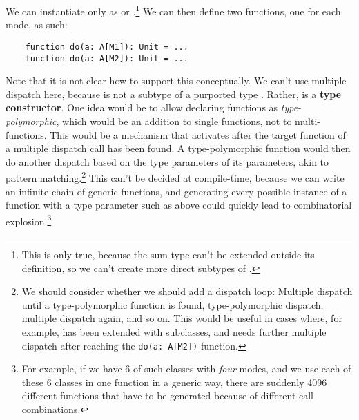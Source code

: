 We can instantiate  only as  or .\footnote{This is only true, because the sum type can't be extended outside its definition, so we can't create more direct subtypes of .} We can then define two functions, one for each mode, as such:

\begin{lstlisting}
    function do(a: A[M1]): Unit = ...
    function do(a: A[M2]): Unit = ...
\end{lstlisting}

Note that it is not clear how to support this conceptually. We can't use multiple dispatch here, because  is not a subtype of a purported type . Rather,  is a \textbf{type constructor}. One idea would be to allow declaring functions as \textit{type-polymorphic}, which would be an addition to single functions, not to multi-functions. This would be a mechanism that activates after the target function of a multiple dispatch call has been found. A type-polymorphic function would then do another dispatch based on the type parameters of its parameters, akin to pattern matching.\footnote{We should consider whether we should add a dispatch loop: Multiple dispatch until a type-polymorphic function is found, type-polymorphic dispatch, multiple dispatch again, and so on. This would be useful in cases where, for example,  has been extended with subclasses, and needs further multiple dispatch after reaching the \texttt{do(a: A[M2])} function.} This can't be decided at compile-time, because we can write an infinite chain of generic functions, and generating every possible instance of a function with a type parameter such as above could quickly lead to combinatorial explosion.\footnote{For example, if we have 6 of such classes with \textit{four} modes, and we use each of these 6 classes in one function in a generic way, there are suddenly 4096 different functions that have to be generated because of different call combinations.}



